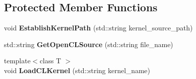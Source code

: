 \subsection*{Protected Member Functions}
\begin{DoxyCompactItemize}
\item 
void {\bfseries Establish\+Kernel\+Path} (std\+::string kernel\+\_\+source\+\_\+path)\hypertarget{classjaspl_1_1ocl_1_1_j_filter_a98da45b0e88b33bdbdffa3c281a96f1e}{}\label{classjaspl_1_1ocl_1_1_j_filter_a98da45b0e88b33bdbdffa3c281a96f1e}

\item 
std\+::string {\bfseries Get\+Open\+C\+L\+Source} (std\+::string file\+\_\+name)\hypertarget{classjaspl_1_1ocl_1_1_j_filter_a585e6a8bb484ded03e203fda06fdb3e6}{}\label{classjaspl_1_1ocl_1_1_j_filter_a585e6a8bb484ded03e203fda06fdb3e6}

\item 
{\footnotesize template$<$class T $>$ }\\void {\bfseries Load\+C\+L\+Kernel} (std\+::string kernel\+\_\+name)\hypertarget{classjaspl_1_1ocl_1_1_j_filter_a169d6fe05c33fadc01066e7976a90e2a}{}\label{classjaspl_1_1ocl_1_1_j_filter_a169d6fe05c33fadc01066e7976a90e2a}

\end{DoxyCompactItemize}

